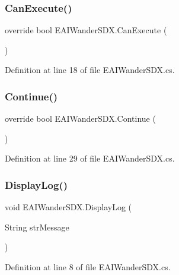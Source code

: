 \subsubsection{\texorpdfstring{CanExecute()}{CanExecute()}}
{\footnotesize\ttfamily override bool E\+A\+I\+Wander\+S\+D\+X.\+Can\+Execute (\begin{DoxyParamCaption}{ }\end{DoxyParamCaption})}



Definition at line 18 of file E\+A\+I\+Wander\+S\+D\+X.\+cs.

\mbox{\label{class_e_a_i_wander_s_d_x_a72ffd17db1e7bde82569e03f8273af29}} 
\subsubsection{\texorpdfstring{Continue()}{Continue()}}
{\footnotesize\ttfamily override bool E\+A\+I\+Wander\+S\+D\+X.\+Continue (\begin{DoxyParamCaption}{ }\end{DoxyParamCaption})}



Definition at line 29 of file E\+A\+I\+Wander\+S\+D\+X.\+cs.

\mbox{\label{class_e_a_i_wander_s_d_x_a91e335aef3d29f6e6b1d9317b7ba2b50}} 
\subsubsection{\texorpdfstring{DisplayLog()}{DisplayLog()}}
{\footnotesize\ttfamily void E\+A\+I\+Wander\+S\+D\+X.\+Display\+Log (\begin{DoxyParamCaption}\item[{String}]{str\+Message }\end{DoxyParamCaption})}



Definition at line 8 of file E\+A\+I\+Wander\+S\+D\+X.\+cs.

\mbox{\label{class_e_a_i_wander_s_d_x_a564d337c452713856e337d239de300ec}} 
